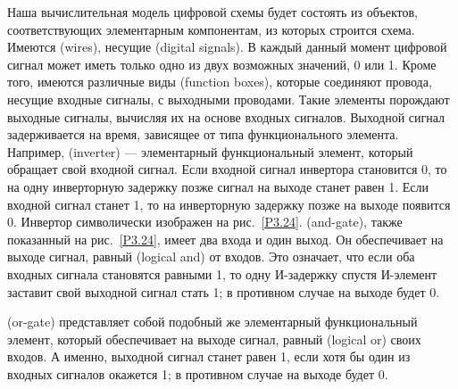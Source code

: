 Наша вычислительная модель цифровой схемы будет состоять из
объектов, соответствующих элементарным компонентам, из которых
строится схема.  Имеются
 (wires), несущие
 (digital signals).  В каждый
данный момент цифровой сигнал может иметь только одно из двух
возможных значений, 0 или 1.  Кроме того, имеются различные виды
 (function boxes),
которые соединяют провода, несущие входные сигналы, с выходными
проводами. Такие элементы порождают выходные сигналы, вычисляя их на
основе входных сигналов.  Выходной сигнал
задерживается на время,
зависящее от типа функционального элемента.  Например,
 (inverter) --- элементарный функциональный
элемент, который обращает свой входной сигнал.  Если входной сигнал
инвертора становится 0, то на одну инверторную задержку позже сигнал на
выходе станет равен 1.  Если входной сигнал станет 1, то на
инверторную задержку позже на выходе появится 0.  Инвертор
символически изображен на рис.~\ref{P3.24}.
 (and-gate), также показанный на
рис.~\ref{P3.24}, имеет два входа и один выход.
Он
обеспечивает на выходе сигнал, равный
 (logical and) от входов.  Это
означает, что если оба входных сигнала становятся равными 1, то одну
И-задержку спустя И-элемент заставит свой выходной сигнал стать 1; в
противном случае на выходе будет 0.

 (or-gate) представляет собой
подобный же элементарный функциональный элемент, который обеспечивает
на выходе сигнал, равный  (logical or) своих входов.  А именно, выходной сигнал станет равен 1, если хотя бы
один из входных сигналов окажется 1; в противном случае на выходе
будет 0.



